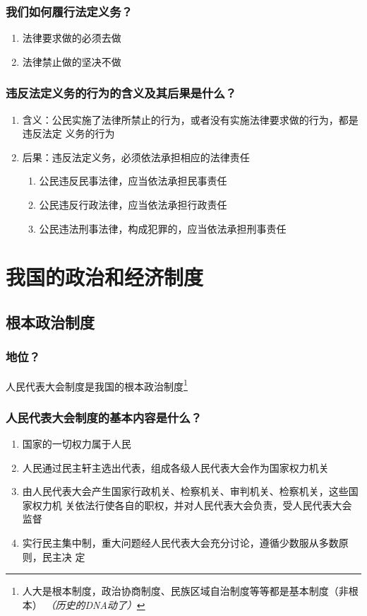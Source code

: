 \documentclass[11pt]{article}
\begin{document}
\subsubsection{我们如何履行法定义务？}
\label{sec:org47bcf2d}
\begin{enumerate}
\item 法律要求做的必须去做
\item 法律禁止做的坚决不做
\end{enumerate}
\subsubsection{违反法定义务的行为的含义及其后果是什么？}
\label{sec:orgbc54175}
\begin{enumerate}
\item 含义：公民实施了法律所禁止的行为，或者没有实施法律要求做的行为，都是违反法定
义务的行为
\item 后果：违反法定义务，必须依法承担相应的法律责任
\begin{enumerate}
\item 公民违反民事法律，应当依法承担民事责任
\item 公民违反行政法律，应当依法承担行政责任
\item 公民违法刑事法律，构成犯罪的，应当依法承担刑事责任
\end{enumerate}
\end{enumerate}
\section{我国的政治和经济制度}
\label{sec:org8555595}
\subsection{根本政治制度}
\label{sec:org3336e44}
\subsubsection{地位？}
\label{sec:org9601bfb}
人民代表大会制度是我国的根本政治制度\footnote{人大是根本制度，政治协商制度、民族区域自治制度等等都是基本制度（非根本）
\emph{（历史的DNA动了）}}
\subsubsection{人民代表大会制度的基本内容是什么？}
\label{sec:org9de61cd}
\begin{enumerate}
\item 国家的一切权力属于人民
\item 人民通过民主轩主选出代表，组成各级人民代表大会作为国家权力机关
\item 由人民代表大会产生国家行政机关、检察机关、审判机关、检察机关，这些国家权力机
关依法行使各自的职权，并对人民代表大会负责，受人民代表大会监督
\item 实行民主集中制，重大问题经人民代表大会充分讨论，遵循少数服从多数原则，民主决
定
\end{enumerate}
\end{document}
